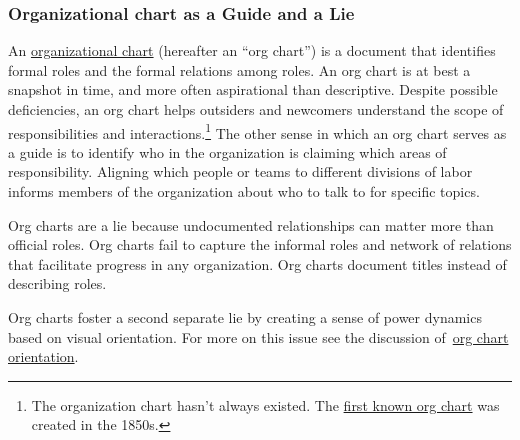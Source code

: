 \subsubsection*{Organizational chart as a Guide and a Lie\label{sec:org-chart-as-guide-and-lie}}

An \href{https://en.wikipedia.org/wiki/Organizational_chart}{organizational chart} 
\iftoggle{WPinmargin}{\marginpar{$>$Wikipedia: Organizational chart}}{}
(hereafter an ``\gls{org chart}'') is a document that identifies formal roles and the formal relations among roles. An org chart is at best a snapshot in time, and more often aspirational than descriptive. Despite possible deficiencies, an org chart helps outsiders and newcomers understand the scope of responsibilities and interactions.\footnote{The organization chart hasn't always existed. The \href{https://en.wikipedia.org/wiki/George_Holt_Henshaw\%23First_organization_chart}{first known org chart} 
was created in the 1850s.} The other sense in which an org chart serves as a guide is to identify who in the organization is claiming which areas of responsibility. Aligning which people or teams to different divisions of labor informs members of the organization about who to talk to for specific topics.

Org charts are a lie because undocumented relationships can matter more than official roles. Org charts fail to capture the informal roles and network of relations that facilitate progress in any organization. Org charts document titles instead of describing roles.

Org charts foster a second separate lie by creating a sense of power dynamics based on visual orientation. For more on this issue see the discussion of~\hyperref[sec:org-chart-orientation]{org chart orientation}\iftoggle{haspagenumbers}{ on page~\pageref{sec:org-chart-orientation}}{}.

